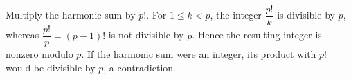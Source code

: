 Multiply the harmonic sum by $p!$. For $1\le k<p$, the integer $\dfrac{p!}{k}$ is divisible by $p$, whereas $\dfrac{p!}{p}=(p-1)!$ is not divisible by $p$. Hence the resulting integer is nonzero modulo $p$. If the harmonic sum were an integer, its product with $p!$ would be divisible by $p$, a contradiction.
